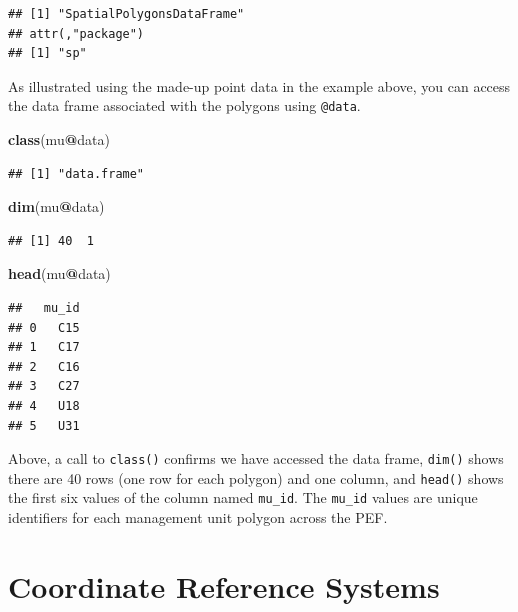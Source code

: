 \documentclass[
]{krantz}
\newenvironment{Shaded}{\begin{snugshade}}{\end{snugshade}}
\newcommand{\KeywordTok}[1]{\textcolor[rgb]{0.13,0.29,0.53}{\textbf{#1}}}
\newcommand{\NormalTok}[1]{#1}
\newcommand{\OperatorTok}[1]{\textcolor[rgb]{0.81,0.36,0.00}{\textbf{#1}}}
\begin{document}
\begin{verbatim}
## [1] "SpatialPolygonsDataFrame"
## attr(,"package")
## [1] "sp"
\end{verbatim}

As illustrated using the made-up point data in the example above, you can access the data frame associated with the polygons using \texttt{@data}.

\begin{Shaded}
\begin{Highlighting}[]
\KeywordTok{class}\NormalTok{(mu}\OperatorTok{@}\NormalTok{data)}
\end{Highlighting}
\end{Shaded}

\begin{verbatim}
## [1] "data.frame"
\end{verbatim}

\begin{Shaded}
\begin{Highlighting}[]
\KeywordTok{dim}\NormalTok{(mu}\OperatorTok{@}\NormalTok{data)}
\end{Highlighting}
\end{Shaded}

\begin{verbatim}
## [1] 40  1
\end{verbatim}

\begin{Shaded}
\begin{Highlighting}[]
\KeywordTok{head}\NormalTok{(mu}\OperatorTok{@}\NormalTok{data)}
\end{Highlighting}
\end{Shaded}

\begin{verbatim}
##   mu_id
## 0   C15
## 1   C17
## 2   C16
## 3   C27
## 4   U18
## 5   U31
\end{verbatim}

Above, a call to \texttt{class()} confirms we have accessed the data frame, \texttt{dim()} shows there are 40 rows (one row for each polygon) and one column, and \texttt{head()} shows the first six values of the column named \texttt{mu\_id}. The \texttt{mu\_id} values are unique identifiers for each management unit polygon across the PEF.

\hypertarget{coordinate-reference-systems}{%
\section{Coordinate Reference Systems}\label{coordinate-reference-systems}}
\end{document}

